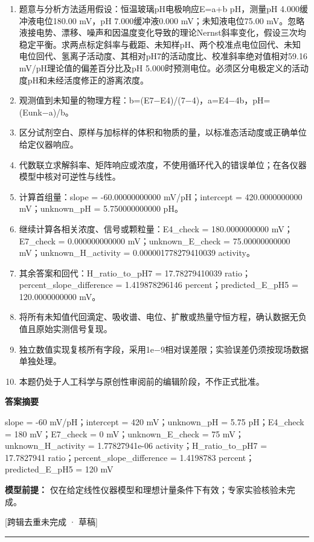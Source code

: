 \documentclass[UTF8,11pt,a4paper]{ctexart}
\begin{document}
\begin{enumerate}
\item 题意与分析方法适用假设：恒温玻璃pH电极响应E=a+b pH，测量pH 4.000缓冲液电位180.00 mV，pH 7.000缓冲液0.000 mV；未知液电位75.00 mV。忽略液接电势、漂移、噪声和因温度变化导致的理论Nernst斜率变化，假设三次均稳定平衡。求两点标定斜率与截距、未知样pH、两个校准点电位回代、未知电位回代、氢离子活动度、其相对pH7的活动度比、校准斜率绝对值相对59.16 mV/pH理论值的偏差百分比及pH 5.000时预测电位。必须区分电极定义的活动度pH和未经活度修正的游离浓度。
\item 观测值到未知量的物理方程：b=(E7−E4)/(7−4)，a=E4−4b，pH=(Eunk−a)/b。
\item 区分试剂空白、原样与加标样的体积和物质的量，以标准态活动度或正确单位给定仪器响应。
\item 代数联立求解斜率、矩阵响应或浓度，不使用循环代入的错误单位；在各仪器模型中核对可逆性与线性。
\item 计算首组量：slope = -60.00000000000 mV/pH；intercept = 420.0000000000 mV；unknown\_pH = 5.750000000000 pH。
\item 继续计算各相关浓度、信号或颗粒量：E4\_check = 180.0000000000 mV；E7\_check = 0.000000000000 mV；unknown\_E\_check = 75.00000000000 mV；unknown\_H\_activity = 0.000001778279410039 activity。
\item 其余答案和回代：H\_ratio\_to\_pH7 = 17.78279410039 ratio；percent\_slope\_difference = 1.419878296146 percent；predicted\_E\_pH5 = 120.0000000000 mV。
\item 将所有未知值代回滴定、吸收谱、电位、扩散或热量守恒方程，确认数据无负值且原始实测信号复现。
\item 独立数值实现复核所有字段，采用1e−9相对误差限；实验误差仍须按现场数据单独处理。
\item 本题仍处于人工科学与原创性审阅前的编辑阶段，不作正式批准。
\end{enumerate}
\noindent\textbf{答案摘要}\par
slope = -60 mV/pH；intercept = 420 mV；unknown\_pH = 5.75 pH；E4\_check = 180 mV；E7\_check = 0 mV；unknown\_E\_check = 75 mV；unknown\_H\_activity = 1.77827941e-06 activity；H\_ratio\_to\_pH7 = 17.7827941 ratio；percent\_slope\_difference = 1.4198783 percent；predicted\_E\_pH5 = 120 mV\par
\noindent\textbf{模型前提：}
仅在给定线性仪器模型和理想计量条件下有效；专家实验核验未完成。\par
\noindent\textcolor{red!65!black}{[跨辑去重未完成 · 草稿]} \par
\medskip\hrule\medskip
{}
\end{document}
